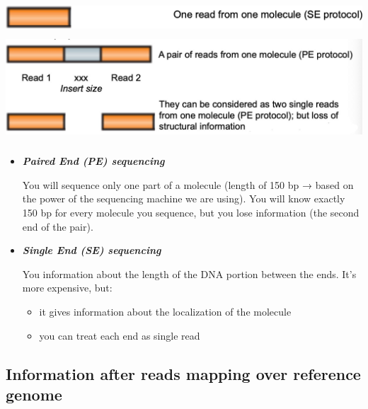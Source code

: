 \includegraphics[width=5.64649in,height=0.35833in]{image11.png}\\ \label{fig:
sequencing methods}
\includegraphics[width=5.97751in,height=1.60125in]{image12.jpeg}

\begin{itemize}
  \item \textit{\textbf{Paired End (PE) sequencing}}

  You will sequence only one part of a molecule (length of 150 bp → based on the
  power of the sequencing machine we are using). You will know exactly 150 bp
  for every molecule you sequence, but you lose information (the second end of
  the pair).

  \item \textit{\textbf{Single End (SE) sequencing}}
  
  You information about the length of the DNA portion between the ends. It's
  more expensive, but:

  \begin{itemize}
    \item
      it gives information about the localization of the molecule
    \item
      you can treat each end as single read
    \end{itemize}

\end{itemize}


\subsection{Information after reads mapping over reference genome}

